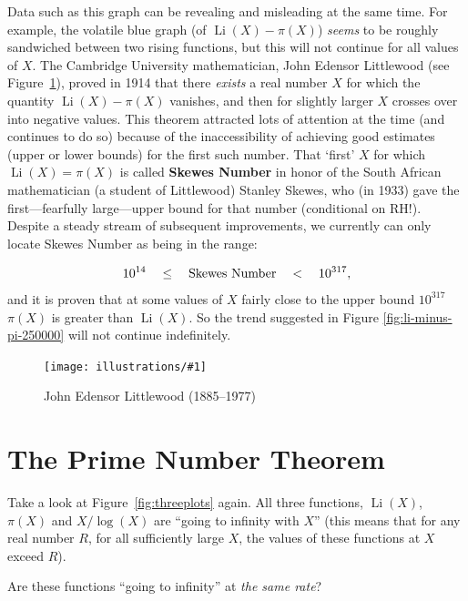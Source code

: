 \documentclass[openany]{book}
\DeclareMathOperator{\Li}{Li}
\newcommand{\ill}[3]{%
   \begin{figure}[H]%
   \vspace{-2ex}
   \centering%
   \texttt{[image: illustrations/\#1]}%
   \caption{#3}%
   \vspace{-2ex}
    \end{figure}}
\theoremstyle{plain}
\theoremstyle{definition}
\begin{document}
{%
Data such as this graph can be revealing and misleading at the same time.  For example, the volatile blue graph (of $\Li(X)-\pi(X)$) {\it seems} to be roughly sandwiched between two rising functions, but this will not continue for all values of $X$.  The Cambridge University mathematician, John Edensor Littlewood (see
Figure~\ref{fig:littlewood}), proved in 1914 that there {\it exists} a real number $X$ for which the quantity $\Li(X)-\pi(X)$ vanishes, and then for slightly larger $X$ crosses over into negative values.  This theorem attracted lots of attention at the time (and continues to do so) because of the inaccessibility of achieving good estimates (upper or lower bounds) for the first such number.  That `first' $X$ for which   $\Li(X) =\pi(X)$ is called {\bf Skewes Number} in honor of the South African mathematician (a student of Littlewood)  Stanley Skewes, who (in 1933) gave the  first---fearfully large---upper bound for that number (conditional on RH!).  Despite a steady stream of subsequent improvements, we currently can only  locate Skewes Number  as being in the range:

$$
10^{14}\ \ \ \le\ \ \ {\rm Skewes\ Number}\ \ \ <\ \ \    10^{317},
$$ and it is proven that at some  values of $X$ fairly close to the upper bound $10^{317}$   $\pi(X)$ is greater than $\Li(X)$. So  the trend suggested in Figure \ref{fig:li-minus-pi-250000} will not continue indefinitely.


\ill{littlewood}{0.35}{John Edensor Littlewood (1885--1977)\label{fig:littlewood}}




\chapter{The Prime Number Theorem\label{sec:pnt}}

Take a look at Figure~\ref{fig:threeplots} again.
All three functions, $\Li(X)$, $\pi(X)$ and $X/\log(X)$
are ``going to infinity with $X$'' (this means
that for any real number $R$, for all sufficiently large $X$,
the values of these functions at $X$ exceed $R$).

Are these functions ``going to infinity'' at {\it the same rate}?

}
\end{document}
